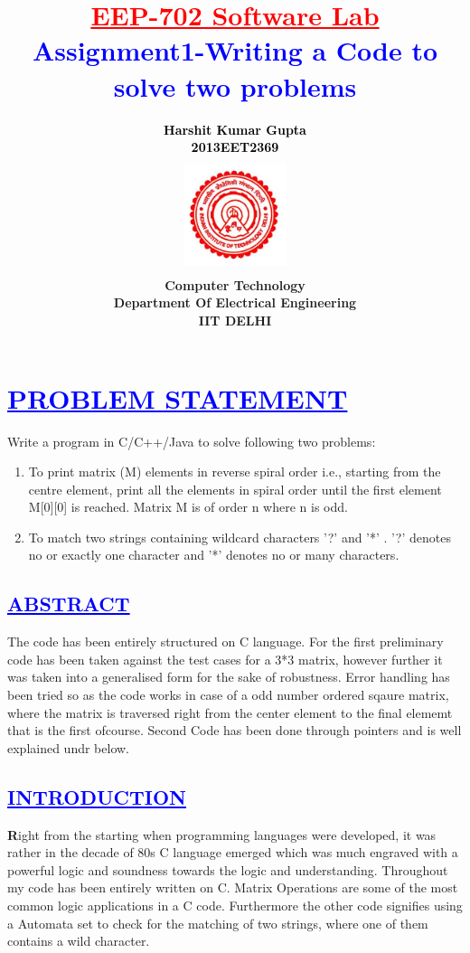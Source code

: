 \documentclass[a4paper,12pt]{report}
\title{\bfseries\huge \textcolor{red}{\underline {EEP-702 Software Lab}} \\{\textcolor{blue}{Assignment1-Writing a Code to solve two problems}}}
\author{\bfseries\large\textcolor{black} {Harshit Kumar Gupta}\\ {\textcolor{black}{2013EET2369}}\\
\includegraphics[width=3cm,height=3.4cm]{./iit.png}\\\noindent Computer Technology\\
\noindent Department Of Electrical Engineering\\IIT DELHI}
\begin{document}
\maketitle
\tableofcontents


\chapter{\textcolor{blue}{\underline {PROBLEM STATEMENT}}}
\noindent 

         Write a program in C/C++/Java to solve following two problems:
	\begin{enumerate}
	\item To print matrix (M) elements in reverse spiral order i.e., starting from the centre element, print all the elements in spiral order until the first element M[0][0] is reached. Matrix M is of order n where n is odd.
        \item To match two strings containing wildcard characters '?' and '*' . '?' denotes no or exactly one character and '*' denotes no or many characters.
	\end{enumerate}

\begin{center}
\chapter{\textcolor{blue}{\underline {ABSTRACT}}}
\end{center}
\noindent The code has been entirely structured on C language. For the first preliminary code has been taken against the test cases for a 3*3 matrix, however further it was taken into a 
generalised form for the sake of robustness. Error handling has been tried so as the code works in case of a odd number ordered sqaure matrix, where the matrix is traversed right from
the center element to the final elememt that is the first ofcourse.
Second Code has been done through pointers and is well explained undr below.

\begin{center}
\chapter{\textcolor{blue}{\underline {INTRODUCTION}}}
\end{center}
\noindent \textbf Right from the starting when programming languages were developed, it was rather in the decade of 80s C language emerged which was much engraved with a powerful 
logic and soundness towards the logic and understanding.
Throughout my code has been entirely written on C. Matrix Operations are some of the most common logic applications in a C code. Furthermore the other code signifies using a Automata
set to check for the matching of two strings, where one of them contains a wild character.
\end{document}

